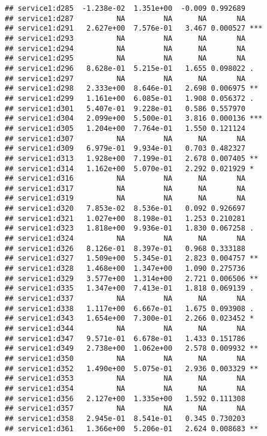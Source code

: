 \documentclass[
]{article}
\begin{document}
\begin{verbatim}
## service1:d285  -1.238e-02  1.351e+00  -0.009 0.992689    
## service1:d287          NA         NA      NA       NA    
## service1:d291   2.627e+00  7.576e-01   3.467 0.000527 ***
## service1:d293          NA         NA      NA       NA    
## service1:d294          NA         NA      NA       NA    
## service1:d295          NA         NA      NA       NA    
## service1:d296   8.628e-01  5.215e-01   1.655 0.098022 .  
## service1:d297          NA         NA      NA       NA    
## service1:d298   2.333e+00  8.646e-01   2.698 0.006975 ** 
## service1:d299   1.161e+00  6.085e-01   1.908 0.056372 .  
## service1:d301   5.407e-01  9.228e-01   0.586 0.557970    
## service1:d304   2.099e+00  5.500e-01   3.816 0.000136 ***
## service1:d305   1.204e+00  7.764e-01   1.550 0.121124    
## service1:d307          NA         NA      NA       NA    
## service1:d309   6.979e-01  9.934e-01   0.703 0.482327    
## service1:d313   1.928e+00  7.199e-01   2.678 0.007405 ** 
## service1:d314   1.162e+00  5.070e-01   2.292 0.021929 *  
## service1:d316          NA         NA      NA       NA    
## service1:d317          NA         NA      NA       NA    
## service1:d319          NA         NA      NA       NA    
## service1:d320   7.853e-02  8.536e-01   0.092 0.926697    
## service1:d321   1.027e+00  8.198e-01   1.253 0.210281    
## service1:d323   1.818e+00  9.936e-01   1.830 0.067258 .  
## service1:d324          NA         NA      NA       NA    
## service1:d326   8.126e-01  8.397e-01   0.968 0.333188    
## service1:d327   1.509e+00  5.345e-01   2.823 0.004757 ** 
## service1:d328   1.468e+00  1.347e+00   1.090 0.275736    
## service1:d329   3.577e+00  1.314e+00   2.721 0.006506 ** 
## service1:d335   1.347e+00  7.413e-01   1.818 0.069139 .  
## service1:d337          NA         NA      NA       NA    
## service1:d338   1.117e+00  6.667e-01   1.675 0.093908 .  
## service1:d343   1.654e+00  7.300e-01   2.266 0.023452 *  
## service1:d344          NA         NA      NA       NA    
## service1:d347   9.571e-01  6.678e-01   1.433 0.151786    
## service1:d349   2.738e+00  1.062e+00   2.578 0.009932 ** 
## service1:d350          NA         NA      NA       NA    
## service1:d352   1.490e+00  5.075e-01   2.936 0.003329 ** 
## service1:d353          NA         NA      NA       NA    
## service1:d354          NA         NA      NA       NA    
## service1:d356   2.127e+00  1.335e+00   1.592 0.111308    
## service1:d357          NA         NA      NA       NA    
## service1:d358   2.945e-01  8.541e-01   0.345 0.730203    
## service1:d361   1.366e+00  5.206e-01   2.624 0.008683 ** 

\end{verbatim}
\end{document}
